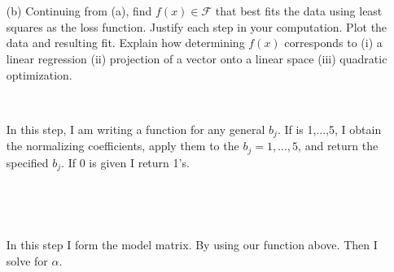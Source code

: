 \documentclass[]{article}
\newenvironment{Shaded}{\begin{snugshade}}{\end{snugshade}}
\newcommand{\KeywordTok}[1]{\textcolor[rgb]{0.13,0.29,0.53}{\textbf{#1}}}
\newcommand{\DataTypeTok}[1]{\textcolor[rgb]{0.13,0.29,0.53}{#1}}
\newcommand{\DecValTok}[1]{\textcolor[rgb]{0.00,0.00,0.81}{#1}}
\newcommand{\FloatTok}[1]{\textcolor[rgb]{0.00,0.00,0.81}{#1}}
\newcommand{\StringTok}[1]{\textcolor[rgb]{0.31,0.60,0.02}{#1}}
\newcommand{\CommentTok}[1]{\textcolor[rgb]{0.56,0.35,0.01}{\textit{#1}}}
\newcommand{\ControlFlowTok}[1]{\textcolor[rgb]{0.13,0.29,0.53}{\textbf{#1}}}
\newcommand{\OperatorTok}[1]{\textcolor[rgb]{0.81,0.36,0.00}{\textbf{#1}}}
\newcommand{\NormalTok}[1]{#1}
\begin{document}
~

~

\begin{itemize}
\item[(b)] Continuing from (a), find $f(x) \in \mathcal{F}$ that best fits the data using least squares as the loss function.  Justify each step in your computation.  Plot the data and resulting fit.   Explain how determining $f(x)$ corresponds to (i) a linear regression (ii) projection of a vector onto a linear space (iii) quadratic optimization.
\end{itemize}

~

\begin{itemize} \item[] 
In this step, I am writing a function for any general $b_j$. If  is 1,...,5, I obtain the normalizing coefficients, apply them to the $b_j = 1,...,5$, and return the specified $b_j$. If 0 is given I return 1's. 
\end{itemize}

~

\begin{Shaded}
\end{Shaded}

~

\begin{itemize} \item[] 
In this step I form the model matrix. By using our function  above. Then I solve for $\alpha$.
\end{itemize}
\end{document}
